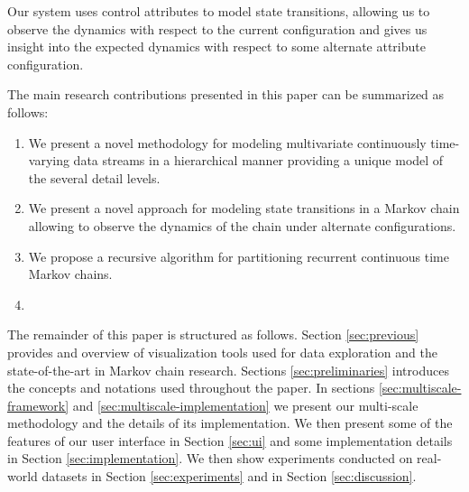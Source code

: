 Our system uses control attributes to model state transitions, allowing us to observe
the dynamics with respect to the current configuration and gives us insight into the
expected dynamics with respect to some alternate attribute configuration.

The main research contributions presented in this paper can be summarized as follows:
\begin{enumerate}{}
  \item We present a novel methodology for modeling multivariate continuously time-varying data streams
  in a hierarchical manner providing a unique model of the several detail levels.
  \item We present a novel approach for modeling state transitions in a Markov chain allowing
  to observe the dynamics of the chain under alternate configurations.
  \item We propose a recursive algorithm for partitioning recurrent continuous time Markov chains.
  \item {}
\end{enumerate}



The remainder of this paper is structured as follows. Section \ref{sec:previous} provides and overview
of visualization tools used for data exploration and the state-of-the-art in Markov chain research.
Sections \ref{sec:preliminaries} introduces the concepts and notations used throughout the paper.
In sections \ref{sec:multiscale-framework} and \ref{sec:multiscale-implementation} we present
our multi-scale methodology and the details of its implementation. We then present some of the 
features of our user interface in Section \ref{sec:ui} and some implementation details in Section
\ref{sec:implementation}. We then show experiments conducted on real-world datasets in Section \ref{sec:experiments}
and  in Section \ref{sec:discussion}.

